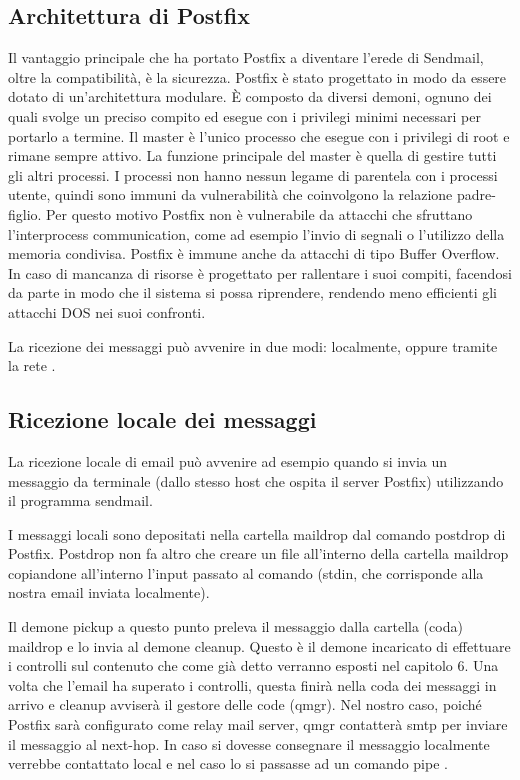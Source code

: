   \subsection{Architettura di Postfix}
  Il vantaggio principale che ha portato Postfix a diventare l’erede di Sendmail, oltre la compatibilità, è la sicurezza. Postfix è stato progettato in modo da essere dotato di un’architettura modulare. È composto da diversi demoni, ognuno dei quali svolge un preciso compito ed esegue con i privilegi minimi necessari per portarlo a termine. Il  master è l’unico processo che esegue con i privilegi di root e rimane sempre attivo. La funzione principale del master è quella di gestire tutti gli altri processi. I processi non hanno nessun legame di parentela con i processi utente, quindi sono immuni da vulnerabilità che coinvolgono la relazione padre-figlio. Per questo motivo Postfix non è vulnerabile da attacchi che sfruttano l’interprocess communication, come ad esempio l’invio di segnali o l’utilizzo della memoria condivisa. Postfix è immune anche da attacchi di tipo Buffer Overflow. In caso di mancanza di risorse è progettato per rallentare i suoi compiti, facendosi da parte in modo che il sistema si possa riprendere, rendendo meno efficienti gli attacchi DOS nei suoi confronti.
  
  La ricezione dei messaggi può avvenire in due modi: localmente, oppure tramite la rete \cite{hildebrandt2005book}.
  
  \subsection{Ricezione locale dei messaggi}
  La ricezione locale di email può avvenire ad esempio quando si invia un messaggio da terminale (dallo stesso host che ospita il server Postfix) utilizzando il programma sendmail. 
  
  I messaggi locali sono depositati nella cartella maildrop dal comando postdrop di Postfix. Postdrop non fa altro che creare un file all’interno della cartella maildrop copiandone all’interno l’input passato al comando (stdin, che corrisponde alla nostra email inviata localmente). 
  
  Il demone pickup a questo punto preleva il messaggio dalla cartella (coda) maildrop e lo invia al demone cleanup. Questo è il demone incaricato di effettuare i controlli sul contenuto che come già detto verranno esposti nel capitolo 6. Una volta che l’email ha superato i controlli, questa finirà nella coda dei messaggi in arrivo e cleanup avviserà il gestore delle code (qmgr). 
  Nel nostro caso, poiché Postfix sarà configurato come relay mail server, qmgr contatterà smtp per inviare il messaggio al next-hop. In caso si dovesse consegnare il messaggio localmente verrebbe contattato local e nel caso lo si passasse ad un comando pipe \cite{Postfix2}.
  
